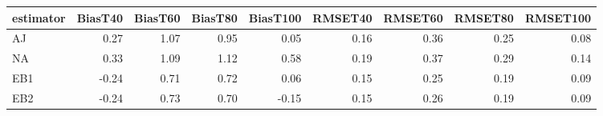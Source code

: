 \begin{table}[ht]
\centering
\begin{tabular}{lrrrrrrrr}
  \toprule
estimator & BiasT40 & BiasT60 & BiasT80 & BiasT100 & RMSET40 & RMSET60 & RMSET80 & RMSET100 \\ 
  \midrule
AJ & 0.27 & 1.07 & 0.95 & 0.05 & 0.16 & 0.36 & 0.25 & 0.08 \\ 
  NA & 0.33 & 1.09 & 1.12 & 0.58 & 0.19 & 0.37 & 0.29 & 0.14 \\ 
  EB1 & -0.24 & 0.71 & 0.72 & 0.06 & 0.15 & 0.25 & 0.19 & 0.09 \\ 
  EB2 & -0.24 & 0.73 & 0.70 & -0.15 & 0.15 & 0.26 & 0.19 & 0.09 \\ 
   \bottomrule
\end{tabular}
\end{table}

